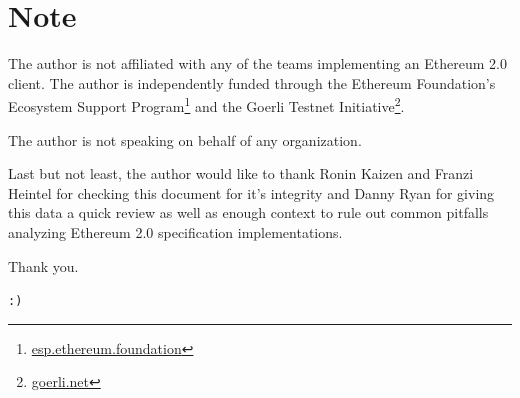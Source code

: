 \documentclass[twoside,twocolumn]{article}
\begin{document}
\vspace{\fill}

\section*{Note}
The author is not affiliated with any of the teams implementing an Ethereum 2.0 client. The author is independently funded through the Ethereum Foundation's Ecosystem Support Program\footnote{\href{https://esp.ethereum.foundation}{esp.ethereum.foundation}} and the Goerli Testnet Initiative\footnote{\href{https://goerli.net}{goerli.net}}.\par

The author is not speaking on behalf of any organization.\par

Last but not least, the author would like to thank Ronin Kaizen and Franzi Heintel for checking this document for it's integrity and Danny Ryan for giving this data a quick review as well as enough context to rule out common pitfalls analyzing Ethereum 2.0 specification implementations.\par

Thank you.\par

\texttt{:)}
\end{document}
